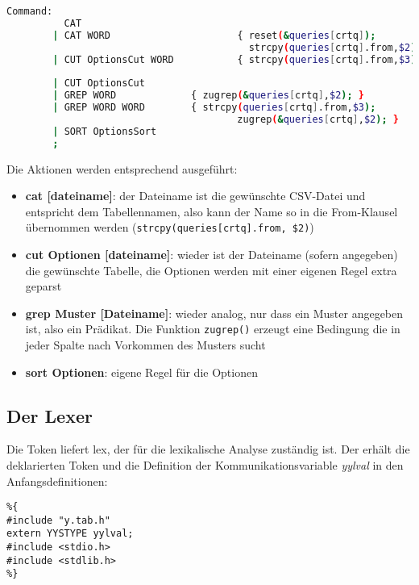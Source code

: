 \begin{lstlisting}[language=Bash]
Command:
          CAT                           
        | CAT WORD                      { reset(&queries[crtq]);
                                          strcpy(queries[crtq].from,$2);} 
        | CUT OptionsCut WORD           { strcpy(queries[crtq].from,$3);}
                        
        | CUT OptionsCut        
        | GREP WORD             { zugrep(&queries[crtq],$2); }
        | GREP WORD WORD        { strcpy(queries[crtq].from,$3);
                                        zugrep(&queries[crtq],$2); }
        | SORT OptionsSort 
        ;
\end{lstlisting}

Die Aktionen werden entsprechend ausgeführt:
\begin{itemize}
\item \textbf{cat [dateiname]}: der Dateiname ist die gewünschte CSV-Datei und entspricht dem Tabellennamen, also kann der Name so in die From-Klausel übernommen werden (\lstinline{strcpy(queries[crtq].from, $2)})
\item \textbf{cut Optionen [dateiname]}: wieder ist der Dateiname (sofern angegeben) die gewünschte Tabelle, die Optionen werden mit einer eigenen Regel extra geparst
\item \textbf{grep Muster [Dateiname]}: wieder analog, nur dass ein Muster angegeben ist, also ein Prädikat. Die Funktion \lstinline{zugrep()} erzeugt eine Bedingung die in jeder Spalte nach Vorkommen des Musters sucht
\item \textbf{sort Optionen}: eigene Regel für die Optionen
\end{itemize}

\subsection{Der Lexer}
Die Token liefert lex, der für die lexikalische Analyse zuständig ist. Der erhält die deklarierten Token und die Definition der Kommunikationsvariable \textit{yylval} in den Anfangsdefinitionen:
\begin{lstlisting}
%{
#include "y.tab.h"
extern YYSTYPE yylval;
#include <stdio.h>
#include <stdlib.h>
%}
\end{lstlisting}

